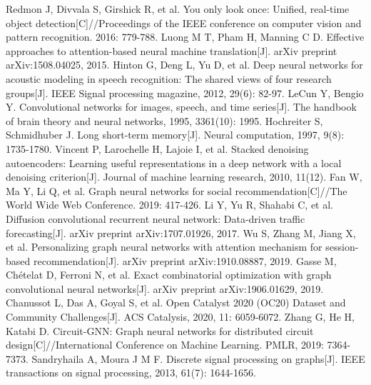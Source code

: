 \cleardoublepage


\begin{thebibliography}{99}  
     Redmon J, Divvala S, Girshick R, et al. You only look once: Unified, real-time object detection[C]//Proceedings of the IEEE conference on computer vision and pattern recognition. 2016: 779-788.
     Luong M T, Pham H, Manning C D. Effective approaches to attention-based neural machine translation[J]. arXiv preprint arXiv:1508.04025, 2015.
     Hinton G, Deng L, Yu D, et al. Deep neural networks for acoustic modeling in speech recognition: The shared views of four research groups[J]. IEEE Signal processing magazine, 2012, 29(6): 82-97.
     LeCun Y, Bengio Y. Convolutional networks for images, speech, and time series[J]. The handbook of brain theory and neural networks, 1995, 3361(10): 1995.
     Hochreiter S, Schmidhuber J. Long short-term memory[J]. Neural computation, 1997, 9(8): 1735-1780.
     Vincent P, Larochelle H, Lajoie I, et al. Stacked denoising autoencoders: Learning useful representations in a deep network with a local denoising criterion[J]. Journal of machine learning research, 2010, 11(12).
     Fan W, Ma Y, Li Q, et al. Graph neural networks for social recommendation[C]//The World Wide Web Conference. 2019: 417-426.
     Li Y, Yu R, Shahabi C, et al. Diffusion convolutional recurrent neural network: Data-driven traffic forecasting[J]. arXiv preprint arXiv:1707.01926, 2017.
     Wu S, Zhang M, Jiang X, et al. Personalizing graph neural networks with attention mechanism for session-based recommendation[J]. arXiv preprint arXiv:1910.08887, 2019.
     Gasse M, Chételat D, Ferroni N, et al. Exact combinatorial optimization with graph convolutional neural networks[J]. arXiv preprint arXiv:1906.01629, 2019.
     Chanussot L, Das A, Goyal S, et al. Open Catalyst 2020 (OC20) Dataset and Community Challenges[J]. ACS Catalysis, 2020, 11: 6059-6072.
     Zhang G, He H, Katabi D. Circuit-GNN: Graph neural networks for distributed circuit design[C]//International Conference on Machine Learning. PMLR, 2019: 7364-7373.
     Sandryhaila A, Moura J M F. Discrete signal processing on graphs[J]. IEEE transactions on signal processing, 2013, 61(7): 1644-1656.

\end{thebibliography}
